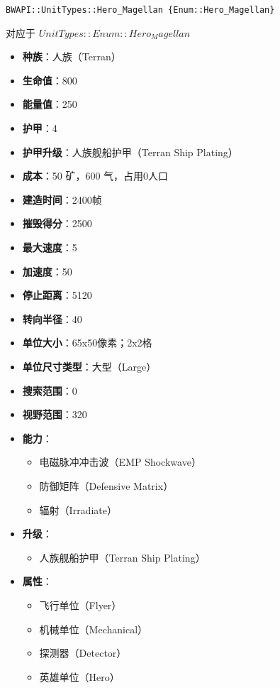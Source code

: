 \begin{tcolorbox}[colback=white, colframe=black!60!white, title=Hero\_Magellan(), arc=0mm]
    \begin{verbatim}
BWAPI::UnitTypes::Hero_Magellan {Enum::Hero_Magellan}
    \end{verbatim}
    对应于  $ UnitTypes::Enum::Hero_Magellan $ 
    \begin{itemize}
        \item \textbf{种族}：人族（Terran）
        \item \textbf{生命值}：800
        \item \textbf{能量值}：250
        \item \textbf{护甲}：4
        \item \textbf{护甲升级}：人族舰船护甲（Terran Ship Plating）
        \item \textbf{成本}：50 矿，600 气，占用0人口
        \item \textbf{建造时间}：2400帧
        \item \textbf{摧毁得分}：2500
        \item \textbf{最大速度}：5
        \item \textbf{加速度}：50
        \item \textbf{停止距离}：5120
        \item \textbf{转向半径}：40
        \item \textbf{单位大小}：65x50像素；2x2格
        \item \textbf{单位尺寸类型}：大型（Large）
        \item \textbf{搜索范围}：0
        \item \textbf{视野范围}：320
        \item \textbf{能力}：
            \begin{itemize}
                \item 电磁脉冲冲击波（EMP Shockwave）
                \item 防御矩阵（Defensive Matrix）
                \item 辐射（Irradiate）
            \end{itemize}
        \item \textbf{升级}：
            \begin{itemize}
                \item 人族舰船护甲（Terran Ship Plating）
            \end{itemize}
        \item \textbf{属性}：
            \begin{itemize}
                \item 飞行单位（Flyer）
                \item 机械单位（Mechanical）
                \item 探测器（Detector）
                \item 英雄单位（Hero）
            \end{itemize}
    \end{itemize}
    
\end{tcolorbox}

